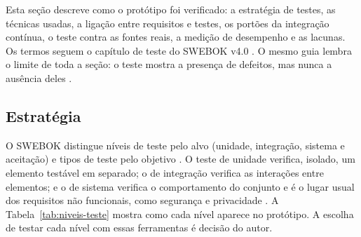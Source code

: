 Esta seção descreve como o protótipo foi verificado: a estratégia de testes,
as técnicas usadas, a ligação entre requisitos e testes, os portões da
integração contínua, o teste contra as fontes reais, a medição de desempenho
e as lacunas. Os termos seguem o capítulo de teste do SWEBOK v4.0
\cite{swebok4}. O mesmo guia lembra o limite de toda a seção: o teste mostra
a presença de defeitos, mas nunca a ausência deles \cite[cap.~5, seç.~1.2.8]{swebok4}.

\subsection{Estratégia}
\label{sec:desenv-testes-estrategia}

O SWEBOK distingue níveis de teste pelo alvo (unidade, integração, sistema e
aceitação) e tipos de teste pelo objetivo \cite[cap.~5, seç.~2]{swebok4}.
O teste de unidade verifica, isolado, um elemento testável em separado; o de
integração verifica as interações entre elementos; e o de sistema verifica o
comportamento do conjunto e é o lugar usual dos requisitos não funcionais,
como segurança e privacidade \cite[cap.~5, seç.~2.1]{swebok4}. A
Tabela~\ref{tab:niveis-teste} mostra como cada nível aparece no protótipo.
A escolha de testar cada nível com essas ferramentas é decisão do autor.

